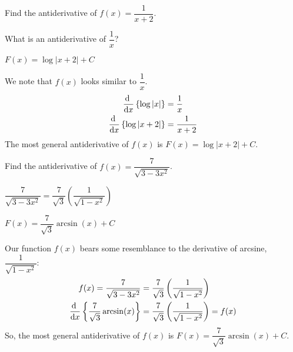 \begin{Mquestion}
Find the antiderivative of
$f(x)=\dfrac{1}{x+2}$.
\end{Mquestion}
\begin{hint}
What is an antiderivative of $\dfrac{1}{x}$?
\end{hint}
\begin{answer}
$F(x)=\log|x+2|+C$
\end{answer}
\begin{solution}
We note that $f(x)$ looks similar to $\dfrac{1}{x}$.
\begin{align*}
\diff{}{x}\left\{\log|x|\right\}&=\frac{1}{x}\\
\diff{}{x}\left\{\log|x+2|\right\}&=\frac{1}{x+2}
\end{align*}
The most general antiderivative of $f(x)$ is $F(x)=\log|x+2|+C$.
\end{solution}

\begin{question}\label{s4.1arcsin1}
Find the antiderivative of
$f(x)=\dfrac{7}{\sqrt{3-3x^2}}$.
\end{question}
\begin{hint}
$\dfrac{7}{\sqrt{3-3x^2}}=\dfrac{7}{\sqrt{3}}\left(\dfrac{1}{\sqrt{1-x^2}}\right)$
\end{hint}
\begin{answer}
$F(x)=\dfrac{7}{\sqrt{3}}\arcsin(x)+C$
\end{answer}
\begin{solution}
Our function $f(x)$ bears some resemblance to the derivative of arcsine, $\dfrac{1}{\sqrt{1-x^2}}$:
\begin{align*}
f(x)=\dfrac{7}{\sqrt{3-3x^2}}&=\dfrac{7}{\sqrt{3}}\left(\dfrac{1}{\sqrt{1-x^2}}\right)\\
\diff{}{x}\left\{\frac{7}{\sqrt{3}}\arcsin(x)\right\}&=\frac{7}{\sqrt{3}}\left(\frac{1}{\sqrt{1-x^2}}\right)=f(x)
\end{align*}
So, the most general antiderivative of $f(x)$ is
$F(x)=\dfrac{7}{\sqrt{3}}\arcsin(x)+C$.
\end{solution}




